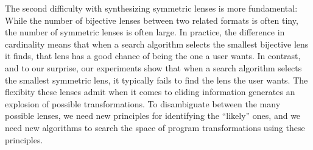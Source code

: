 \documentclass[acmsmall,screen,anonymous]{acmart}
\begin{document}
The second difficulty with synthesizing symmetric lenses is more fundamental:
While the number of bijective lenses
between two related formats is often tiny, the number of symmetric lenses is often
large.  In practice, the difference in cardinality means that when a search algorithm selects the smallest
bijective lens it finds, that lens has a good chance of being the
one a user wants.  In contrast, and to our surprise, our experiments show  that
when a search algorithm selects the smallest symmetric lens, it typically fails
to find the lens the user wants.  The flexibity these lenses admit when it comes to
eliding information generates an explosion of possible transformations.
To disambiguate between the many possible lenses, we need
new principles for identifying the ``likely'' ones, and we need
new algorithms to search the space of program transformations using these principles.
\end{document}
